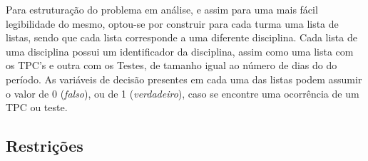 \documentclass{llncs}
\begin{document}
Para estruturação do problema em análise, e assim para uma mais fácil legibilidade do mesmo, optou-se por construir para cada turma uma lista de listas, sendo que cada lista corresponde a uma diferente disciplina.
Cada lista de uma disciplina possui um identificador da disciplina, assim como uma lista com os TPC's e outra com os Testes, de tamanho igual ao número de dias do do período. As variáveis de decisão presentes em cada uma das listas podem assumir o valor de 0 (\textit{falso}), ou de 1 (\textit{verdadeiro}), caso se encontre uma ocorrência de um TPC ou teste.

\subsection{Restrições}
\begin{enumerate}


\end{enumerate}
\end{document}
